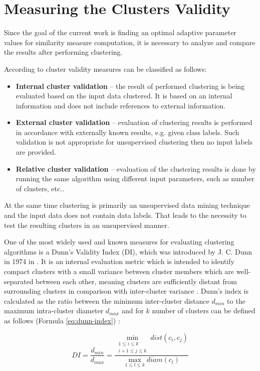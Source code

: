 \section{Measuring the Clusters Validity}

Since the goal of the current work is finding an optimal adaptive parameter values for similarity measure computation, it is necessary to analyze and compare the results after performing clustering. 

According to \cite{online:dunn_cl_valid} cluster validity measures can be classified as follows:
\begin{itemize}
	\item \textbf{Internal cluster validation} -- the result of performed clustering is being evaluated based on the input data clustered. It is based on an internal information and does not include references to external information.
	\item \textbf{External cluster validation} -- evaluation of clustering results is performed in accordance with externally known results, e.g. given class labels. Such validation is not appropriate for unsupervised clustering then no input labels are provided.
	\item \textbf{Relative cluster validation} -- evaluation of the clustering results is done by running the same algorithm using different input parameters, such as number of clusters, etc..
\end{itemize}

At the same time clustering is primarily an unsupervised data mining technique and the input data does not contain data labels. That leads to the necessity to test the resulting clusters in an unsupervised manner. 

One of the most widely used and known measures for evaluating clustering algorithms is a Dunn's Validity Index (DI), which was introduced by J. C. Dunn in 1974 in \cite{article:dunn_orig}. It is an internal evaluation metric which is intended to identify compact clusters with a small variance between cluster members which are well-separated between each other, meaning clusters are sufficiently distant from surrounding clusters in comparison with inter-cluster variance \cite{online:hier_clust_r}. Dunn's index is calculated as the ratio between the minimum inter-cluster distance $d_{min}$ to the maximum intra-cluster diameter $d_{max}$ and for $k$ number of clusters can be defined as follows (Formula \ref{eq:dunn-index}) \cite{article:quant_eval_perf_clust}:

\begin{equation} \label{eq:dunn-index}
	DI = \frac {d_{min}} {d_{max}} = \frac{\min\limits_{\substack{1 \leq i \leq k \\ i+1 \leq j \leq k}} dist(c_i, c_j)} {\max\limits_{1 \leq l \leq k} diam(c_l)}
\end{equation}

